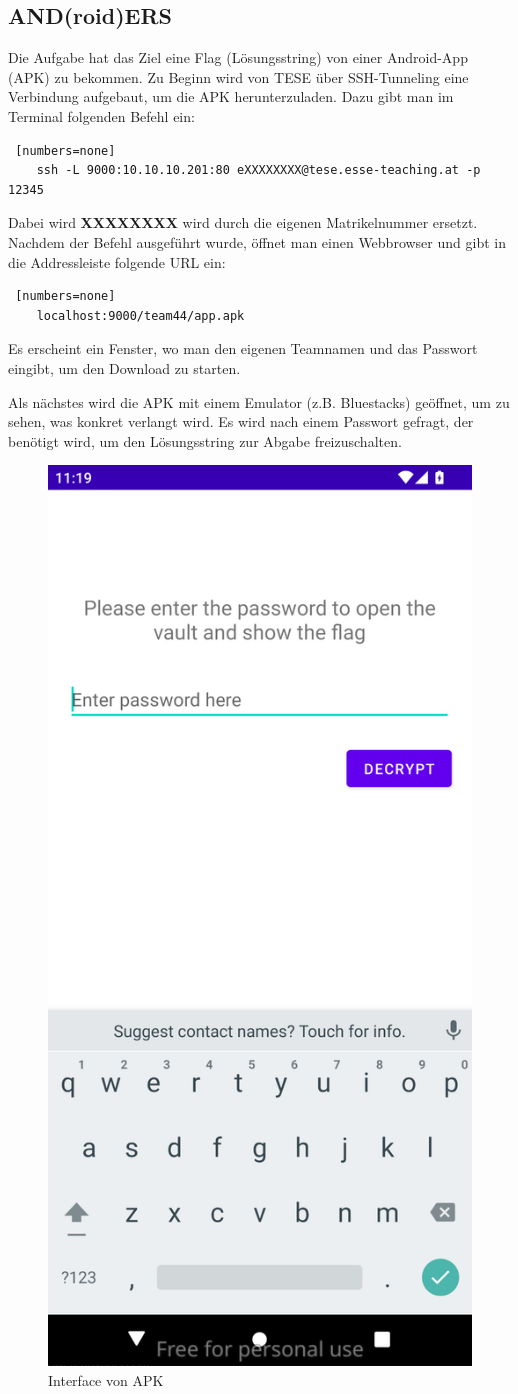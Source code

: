 \documentclass[12pt, a4paper, titlepage, oneside]{scrartcl}
\begin{document}
	\subsection{AND(roid)ERS}
	Die Aufgabe hat das Ziel eine Flag (Lösungsstring) von einer Android-App (APK) zu bekommen. Zu Beginn wird von TESE über SSH-Tunneling eine Verbindung aufgebaut, um die APK herunterzuladen. Dazu gibt man im Terminal folgenden Befehl ein: 
    \begin{lstlisting} [numbers=none]
    ssh -L 9000:10.10.10.201:80 eXXXXXXXX@tese.esse-teaching.at -p 12345
        \end{lstlisting}
    Dabei wird \textbf{XXXXXXXX} wird durch die eigenen Matrikelnummer ersetzt. Nachdem der Befehl ausgeführt wurde, öffnet man einen Webbrowser und gibt in die Addressleiste folgende URL ein: 
    \begin{lstlisting} [numbers=none]
    localhost:9000/team44/app.apk
    \end{lstlisting}
    Es erscheint ein Fenster, wo man den eigenen Teamnamen und das Passwort eingibt, um den Download zu starten. \newline
    
    \noindent Als nächstes wird die APK mit einem Emulator (z.B. Bluestacks) geöffnet, um zu sehen, was konkret verlangt wird. Es wird nach einem Passwort gefragt, der benötigt wird, um den Lösungsstring zur Abgabe freizuschalten. \newline
    
    \begin{figure}
        \centering
        \includegraphics[width=0.25\linewidth]{imgs//AND(roid)ERS/Screenshot from 2025-01-12 12-19-30.png}
        \caption{Interface von APK}
        \label{fig:enter-label}
    \end{figure}
    
\end{document}
